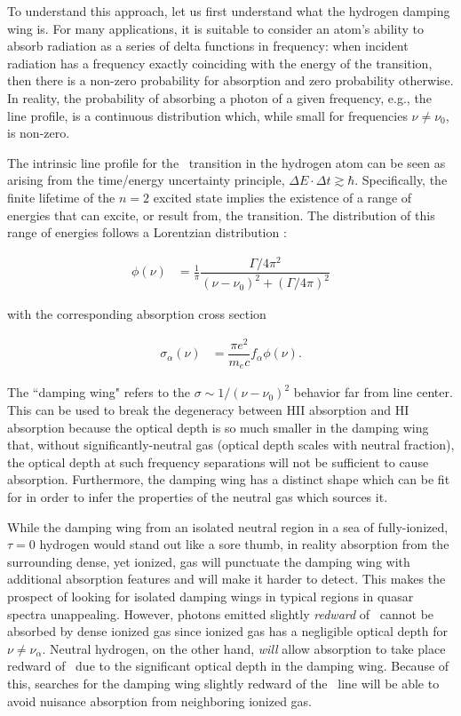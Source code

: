 To understand this approach, let us first understand what the hydrogen damping wing is. For many applications, it is suitable to consider an atom's ability to absorb radiation as a series of delta functions in frequency: when incident radiation has a frequency exactly coinciding with the energy of the transition, then there is a non-zero probability for absorption and zero probability otherwise. In reality, the probability of absorbing a photon of a given frequency, e.g., the line profile, is a continuous distribution which, while small for frequencies $\nu \neq \nu_{0}$, is non-zero. 


The intrinsic line profile for the \lya\ transition in the hydrogen atom can be seen as arising from the time/energy uncertainty principle, $\Delta E \cdot \Delta t \gtrsim \hbar$. Specifically, the finite lifetime of the $n = 2$ excited state implies the existence of a range of energies that can excite, or result from, the transition. The distribution of this range of energies follows a Lorentzian distribution :

\begin{align}
\phi(\nu) &= \frac{1}{\pi} \dfrac{\Gamma/4\pi^{2}}{(\nu - \nu_{0})^{2} + (\Gamma/4\pi)^2}
\end{align}

with the corresponding absorption cross section

\begin{align}
\sigma_{\alpha}(\nu) &= \dfrac{\pi e^2}{m_{e}c} f_{\alpha} \phi(\nu).
\end{align}

The ``damping wing" refers to the $\sigma \sim 1/(\nu-\nu_{0})^{2}$ behavior far from line center. This can be used to break the degeneracy between HII absorption and HI absorption because the optical depth is so much smaller in the damping wing that, without significantly-neutral gas (optical depth scales with neutral fraction), the optical depth at such frequency separations will not be sufficient to cause absorption. Furthermore, the damping wing has a distinct shape which can be fit for in order to infer the properties of the neutral gas which sources it. 


While the damping wing from an isolated neutral region in a sea of fully-ionized, $\tau = 0$ hydrogen would stand out like a sore thumb, in reality absorption from the surrounding dense, yet ionized, gas will punctuate the damping wing with additional absorption features and will make it harder to detect. This makes the prospect of looking for isolated damping wings in typical regions in quasar spectra unappealing. However, photons emitted slightly \textit{redward} of \lya\ cannot be absorbed by dense ionized gas since ionized gas has a negligible optical depth for $\nu \neq \nu_{\alpha}$. Neutral hydrogen, on the other hand, \textit{will} allow absorption to take place redward of \lya\ due to the significant optical depth in the damping wing. Because of this, searches for the damping wing slightly redward of the \lya\ line will be able to avoid nuisance absorption from neighboring ionized gas.



